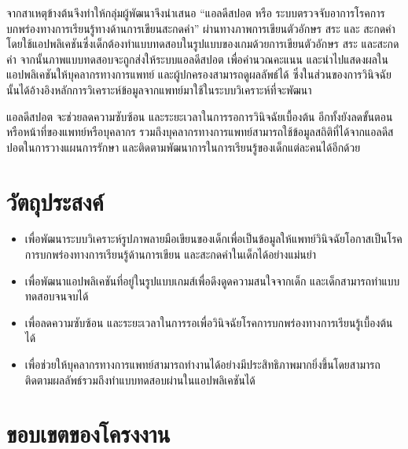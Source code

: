 \documentclass[12pt,oneside,openright,a4paper]{cpe-thai-project}
\begin{document}
\par จากสาเหตุข้างต้นจึงทำให้กลุ่มผู้พัฒนาจึงนำเสนอ “แอลดีสปอต หรือ ระบบตรวจจับอาการโรคการบกพร่องทางการเรียนรู้ทางด้านการเขียนสะกดคำ” ผ่านทางภาพการเขียนตัวอักษร สระ และ สะกดคำโดยใช้แอปพลิเคชันซึ่งเด็กต้องทำแบบทดสอบในรูปแบบของเกมด้วยการเขียนตัวอักษร สระ และสะกดคำ จากนั้นภาพแบบทดสอบจะถูกส่งให้ระบบแอลดีสปอต เพื่อคำนวณคะแนน และนำไปแสดงผลในแอปพลิเคชันให้บุคลากรทางการแพทย์ และผู้ปกครองสามารถดูผลลัพธ์ได้ ซึ่งในส่วนของการวินิจฉัยนั้นได้อ้างอิงหลักการวิเคราะห์ข้อมูลจากแพทย์มาใช้ในระบบวิเคราะห์ที่จะพัฒนา
\par แอลดีสปอต จะช่วยลดความซับซ้อน และระยะเวลาในการรอการวินิจฉัยเบื้องต้น อีกทั้งยังลดขั้นตอนหรือหน้าที่ของแพทย์หรือบุคลากร รวมถึงบุคลากรทางการแพทย์สามารถใช้ข้อมูลสถิติที่ได้จากแอลดีสปอตในการวางแผนการรักษา และติดตามพัฒนาการในการเรียนรู้ของเด็กแต่ละคนได้อีกด้วย





\section{วัตถุประสงค์}

\begin{itemize}
  \item  เพื่อพัฒนาระบบวิเคราะห์รูปภาพลายมือเขียนของเด็กเพื่อเป็นข้อมูลให้แพทย์วินิจฉัยโอกาสเป็นโรคการบกพร่องทางการเรียนรู้ด้านการเขียน และสะกดคำในเด็กได้อย่างแม่นยำ
  \item  เพื่อพัฒนาแอปพลิเคชันที่อยู่ในรูปแบบเกมส์เพื่อดึงดูดความสนใจจากเด็ก และเด็กสามารถทำแบบทดสอบจนจบได้ 
  \item  เพื่อลดความซับซ้อน และระยะเวลาในการรอเพื่อวินิจฉัยโรคการบกพร่องทางการเรียนรู้เบื้องต้นได้ 
  \item  เพื่อช่วยให้บุคลากรทางการแพทย์สามารถทำงานได้อย่างมีประสิทธิภาพมากยิ่งขึ้นโดยสามารถติดตามผลลัพธ์รวมถึงทำแบบทดสอบผ่านในแอปพลิเคชันได้  
  \end{itemize}

\section{ขอบเขตของโครงงาน}
\end{document}
